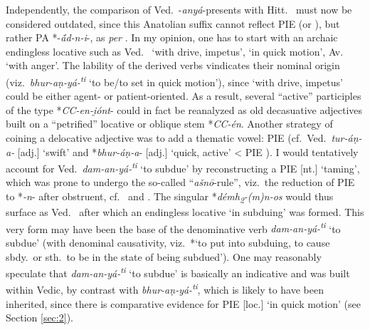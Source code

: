 \documentclass[output=paper,colorlinks,citecolor=brown]{langscibook}
\begin{document}
\largerpage
Independently, the comparison of Ved.\ -\textit{anyá}-presents  with Hitt.\  must now be considered outdated, since this Anatolian  suffix cannot reflect PIE  (or ), but rather PA *-\textit{{ā́}d-n-i}-,  as \textit{per} \citet[526--528]{Sasseville2021}. In my opinion, one has to start with an archaic endingless locative such as Ved.\  ‘with drive, impetus’,   ‘in quick motion’, Av.\   ‘with anger’. The lability of the derived verbs vindicates their nominal origin (viz.\ \textit{bhur-aṇ-yá-\textsuperscript{ti}}  ‘to be/to set in quick motion’), since   ‘with drive, impetus’ could be either agent- or patient-oriented. As a result, several “active” participles of the type *\textit{CC-en-i̯ónt}-   could in fact be reanalyzed as old decasuative adjectives built on a “petrified” locative or oblique stem  *\textit{CC-én}. Another strategy of coining a delocative adjective was to add a thematic vowel: PIE  (cf.\ Ved.\ \textit{tur-áṇ-a-}  [adj.] ‘swift’ and *\textit{bhur-áṇ-a}-  [adj.] ‘quick, active’ < PIE ). I would tentatively account for Ved.\ \textit{dam-an-yá-\textsuperscript{ti}}  ‘to subdue’ by reconstructing a PIE  [nt.] ‘taming’, which was prone to undergo the so-called “\textit{ašnō}-rule”,  viz.\ the reduction of PIE  to *\textit{-n}- after obstruent, cf.\ \citet{Nussbaum2010} and \citet[186--188]{Melchert2010}. The  singular *\textit{démh\textsubscript{2}-(m)n-os} would thus surface as Ved.\  after which an endingless locative  ‘in subduing’ was formed. This very form may have been the base of the denominative verb \textit{dam-an-yá-\textsuperscript{ti}}  ‘to subdue’ (with denominal    causativity, viz.\ *‘to put into subduing, to cause sbdy.\ or sth.\ to be in the state of being subdued’). One may reasonably speculate that \textit{dam-an-yá-\textsuperscript{ti}}  ‘to subdue’ is basically an indicative and was built within Vedic, by contrast with \textit{bhur-aṇ-yá-\textsuperscript{ti}},  which is likely to have been inherited, since there is comparative evidence for PIE  [loc.] ‘in quick motion’ (see Section \ref{sec:2}).
\end{document}

